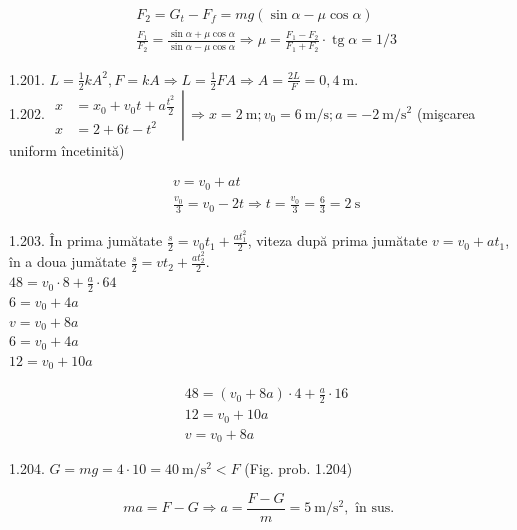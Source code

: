 \documentclass[10pt]{article}
\begin{document}
$$
\begin{aligned}
& F_{2}=G_{t}-F_{f}=m g(\sin \alpha-\mu \cos \alpha) \\
& \frac{F_{1}}{F_{2}}=\frac{\sin \alpha+\mu \cos \alpha}{\sin \alpha-\mu \cos \alpha} \Rightarrow \mu=\frac{F_{1}-F_{2}}{F_{1}+F_{2}} \cdot \operatorname{tg} \alpha=1 / 3
\end{aligned}
$$

1.201. $L=\frac{1}{2} k A^{2}, F=k A \Rightarrow L=\frac{1}{2} F A \Rightarrow A=\frac{2 L}{F}=0,4 \mathrm{~m}$.\\
1.202. $\left.\begin{aligned} x & =x_{0}+v_{0} t+a \frac{t^{2}}{2} \\ x & =2+6 t-t^{2}\end{aligned} \right\rvert\, \Rightarrow x=2 \mathrm{~m} ; v_{0}=6 \mathrm{~m} / \mathrm{s} ; a=-2 \mathrm{~m} / \mathrm{s}^{2}$ (mişcarea uniform încetinită)

$$
\begin{aligned}
& v=v_{0}+a t \\
& \frac{v_{0}}{3}=v_{0}-2 t \Rightarrow t=\frac{v_{0}}{3}=\frac{6}{3}=2 \mathrm{~s}
\end{aligned}
$$

1.203. În prima jumătate $\frac{s}{2}=v_{0} t_{1}+\frac{a t_{1}^{2}}{2}$, viteza după prima jumătate $v=v_{0}+a t_{1}$, în a doua jumătate $\frac{s}{2}=v t_{2}+\frac{a t_{2}^{2}}{2}$.\\
$48=v_{0} \cdot 8+\frac{a}{2} \cdot 64$\\
$6=v_{0}+4 a$\\
$v=v_{0}+8 a$\\
$6=v_{0}+4 a$\\
$12=v_{0}+10 a$

$$
\begin{aligned}
& 48=\left(v_{0}+8 a\right) \cdot 4+\frac{a}{2} \cdot 16 \\
& 12=v_{0}+10 a \\
& v=v_{0}+8 a
\end{aligned}
$$

1.204. $G=m g=4 \cdot 10=40 \mathrm{~m} / \mathrm{s}^{2}<F$ (Fig. prob. 1.204)

$$
m a=F-G \Rightarrow a=\frac{F-G}{m}=5 \mathrm{~m} / \mathrm{s}^{2}, \text { în sus. }
$$
\end{document}
